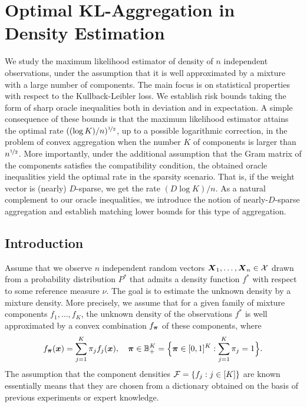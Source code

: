 
\chapter[KL-Aggregation in Density Estimation]{Optimal KL-Aggregation in Density Estimation\label{chap:kl_aggreg}}
\minitoc
	We study the maximum likelihood estimator of density of $n$ independent observations, 
	under the assumption that it is well approximated by a mixture with a large number of 
	components. The main focus is on statistical properties with respect to the 
	Kullback-Leibler loss. We establish risk bounds taking the form of sharp oracle inequalities
	both in deviation and in expectation. A simple consequence of these bounds is that the 
	maximum likelihood estimator attains the optimal rate $((\log K)/n)^{\nicefrac12}$, up to a 
	possible logarithmic correction, in the problem of convex aggregation when the number 
	$K$ of components is larger than $n^{\nicefrac12}$. More importantly, under the additional 
	assumption that the Gram matrix of the components satisfies the compatibility condition, 
	the obtained oracle inequalities yield the optimal rate in the sparsity scenario. That 
	is, if the weight vector is (nearly) $D$-sparse, we get the rate $(D\log K)/n$. As a
	natural complement to our oracle inequalities, we introduce the notion of nearly-$D$-sparse
	aggregation and establish matching lower bounds for this type of aggregation. 
\section{Introduction}
Assume that we observe $n$ independent random vectors $\boldsymbol X_1,\ldots,\boldsymbol X_n\in\mathcal X$ drawn from a probability distribution $P^*$
that admits a density function $f^*$ with respect to some reference measure $\nu$.
The goal is to estimate the unknown density by a mixture density. More precisely, we assume that for a given family of mixture
components $f_1,\ldots,f_K$, the unknown density of the observations $f^*$ is well approximated by a convex combination
$f_{\boldsymbol \pi}$ of these components, where
\begin{equation}
f_{\boldsymbol \pi}(\boldsymbol x)=\sum_{j=1}^K\pi_j f_j(\boldsymbol x), \quad \boldsymbol \pi \in {\mathbb B}_+^K=\Big\{\boldsymbol \pi\in [0,1]^K: \sum_{j=1}^K\pi_j=1\Big\}.
\end{equation}
The assumption that the component densities $\mathcal F=\{f_j:j\in[K]\}$ are known essentially means that they are chosen from a
dictionary obtained on the basis of previous experiments or expert knowledge.

